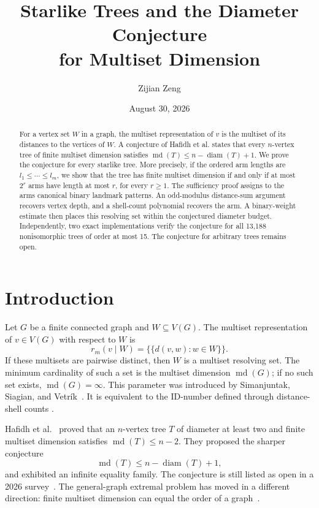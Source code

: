 \documentclass[11pt]{amsart}
\title[Starlike trees and multiset dimension]{Starlike Trees and the Diameter Conjecture\\for Multiset Dimension}
\author{Zijian Zeng}
\date{August 30, 2026}
\theoremstyle{definition}
\newcommand{\mdim}{\operatorname{md}}
\newcommand{\diam}{\operatorname{diam}}
\begin{document}
\begin{abstract}
For a vertex set \(W\) in a graph, the multiset representation of \(v\) is the
multiset of its distances to the vertices of \(W\).  A conjecture of Hafidh
et al. states that every \(n\)-vertex tree of finite multiset dimension
satisfies \(\mdim(T)\le n-\diam(T)+1\).  We prove the conjecture for every
starlike tree.  More precisely, if the ordered arm lengths are
\(l_1\le\cdots\le l_m\), we show that the tree has finite multiset dimension
if and only if at most \(2^r\) arms have length at most \(r\), for every
\(r\ge1\).  The sufficiency proof assigns to the arms canonical binary
landmark patterns.  An odd-modulus distance-sum argument recovers vertex
depth, and a shell-count polynomial recovers the arm.  A binary-weight
estimate then places this resolving set within the conjectured diameter
budget.  Independently, two exact implementations verify the conjecture for
all 13,188 nonisomorphic trees of order at most 15.  The conjecture for
arbitrary trees remains open.
\end{abstract}

\maketitle

\section{Introduction}

Let \(G\) be a finite connected graph and \(W\subseteq V(G)\).  The multiset
representation of \(v\in V(G)\) with respect to \(W\) is
\[
 r_m(v\mid W)=\{\!\{d(v,w):w\in W\}\!\}.
\]
If these multisets are pairwise distinct, then \(W\) is a multiset resolving
set.  The minimum cardinality of such a set is the multiset dimension
\(\mdim(G)\); if no such set exists, \(\mdim(G)=\infty\).  This parameter was
introduced by Simanjuntak, Siagian, and Vetr\'ik~\cite{Simanjuntak2017}.
It is equivalent to the ID-number defined through distance-shell counts
\cite{HakanenYero2024}.

Hafidh et al.~\cite{Hafidh2019} proved that an \(n\)-vertex tree \(T\) of
diameter at least two and finite multiset dimension satisfies
\(\mdim(T)\le n-2\).  They proposed the sharper conjecture
\begin{equation}
 \mdim(T)\le n-\diam(T)+1,                                  \tag{C}
\end{equation}
and exhibited an infinite equality family.  The conjecture is still listed
as open in a 2026 survey~\cite{Albejani2026}.  The general-graph extremal
problem has moved in a different direction: finite multiset dimension can
equal the order of a graph~\cite{Allikvere2026}.
\end{document}
